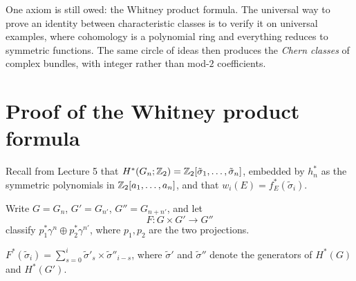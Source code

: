 \lecture

\begin{guiding}
One axiom is still owed: the Whitney product formula. The universal way to prove
an identity between characteristic classes is to verify it on universal
examples, where cohomology is a polynomial ring and everything reduces to
symmetric functions. The same circle of ideas then produces the \emph{Chern
classes} of complex bundles, with integer rather than mod-$2$ coefficients.
\end{guiding}

\section{Proof of the Whitney product formula}

Recall from Lecture 5 that $H^*(G_n;\mathbb{Z}_2)=\mathbb{Z}_2[\tilde\sigma_1,\dots,
\tilde\sigma_n]$, embedded by $h_n^*$ as the symmetric polynomials in
$\mathbb{Z}_2[a_1,\dots,a_n]$, and that $w_i(E)=f_E^*(\tilde\sigma_i)$.

Write $G=G_n$, $G'=G_{n'}$, $G''=G_{n+n'}$, and let
\[
F\colon G\times G'\longrightarrow G''
\]
classify $p_1^*\gamma^n\oplus p_2^*\gamma^{n'}$, where $p_1,p_2$ are the two
projections.

\begin{lemma}\label{lem:F-star}
$\displaystyle F^*(\tilde\sigma_i)
=\sum_{s=0}^{i}\tilde\sigma'_s\times\tilde\sigma''_{i-s}$,
where $\tilde\sigma'$ and $\tilde\sigma''$ denote the generators of $H^*(G)$ and
$H^*(G')$.
\end{lemma}

